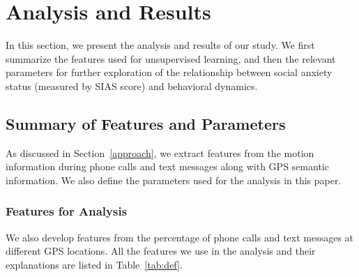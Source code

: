 \section{Analysis and Results}
\label{sec:results}
In this section, we present the analysis and results of our study. We first summarize the features used for unsupervised learning, and then the relevant parameters for further exploration of the relationship between social anxiety status (measured by SIAS score) and behavioral dynamics. 


\subsection{Summary of Features and Parameters}
\label{features_and_parameters}
As discussed in Section~\ref{approach}, we extract features from the motion information during phone calls and text messages along with GPS semantic information.  We also define the parameters used for the analysis in this paper.

\subsubsection{Features for Analysis}
We also develop features from the percentage of phone calls and text messages at different GPS locations. All the features we use in the analysis and their explanations are listed in Table~\ref{tab:def}.

